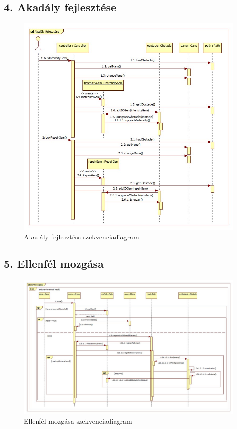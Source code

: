 \subsection{4. Akadály fejlesztése}
\begin{figure}[H]
\begin{center}
\includegraphics[width=17cm]{chapters/chapter05/images/sd_Akadaly_fejlesztese.jpg}
\caption{Akadály fejlesztése szekvenciadiagram}
\label{fig:sd_Akadaly_fejlesztese}
\end{center}
\end{figure}

\subsection{5. Ellenfél mozgása}
\begin{figure}[H]
\begin{center}
\includegraphics[width=17cm]{chapters/chapter05/images/sd_Ellenfel_mozgasa.jpg}
\caption{Ellenfél mozgása szekvenciadiagram}
\label{fig:sd_Ellenfel_mozgasa}
\end{center}
\end{figure}

